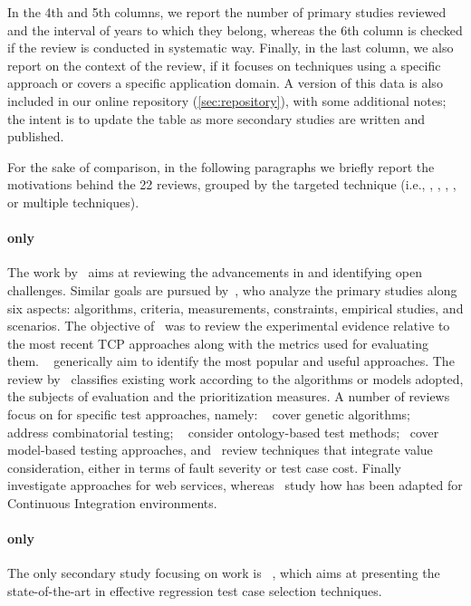 In the 4th and 5th columns, we report the number of primary studies reviewed and the interval of years to which they belong, whereas the 6th column is checked if the review is conducted in systematic way. 
Finally, in the last column, we also report on the context of the review, if it focuses on techniques using a specific approach or covers a specific application domain.
A version of this data is also included in our online repository (\autoref{sec:repository}), with some additional notes; the intent is to update the table as more secondary studies are written and published.

For the sake of comparison, in the following paragraphs we briefly report the motivations behind the 22 reviews, 
grouped by the targeted technique (i.e., \tcp, \tcs, \tsr, \tsa, or multiple techniques).

\paragraph{\tcp only}The work by~\citet{hao_test-case_2016} aims at reviewing the advancements in \tcp and  identifying open challenges. 
Similar goals are pursued by~\citet{lou_survey_2018}, who analyze the primary studies along six aspects: algorithms, criteria, measurements, constraints, empirical studies, and scenarios.
The objective of~\citet{khatibsyarbini_test_2018} was to review the experimental evidence relative to the most recent TCP approaches along with the metrics used for evaluating them. 
~\citet{mukherjee_survey_2018} generically aim to identify the most popular and useful \tcp approaches.
The review by~\citet{samad2021regression} classifies existing work according to the algorithms or models adopted, the subjects of evaluation and the prioritization measures.
A number of reviews focus on \tcp for specific test approaches, namely: ~\citet{bajaj_systematic_2019} 
cover genetic algorithms; ~\citet{abdul2021systematic} address combinatorial testing; ~\citet{hasnain2021ontology} consider ontology-based test methods;~\citet{mohd2021model} cover model-based testing approaches, and~\citet{ahmed_value_2022} review \tcp techniques that  integrate value consideration, either in terms of fault severity or test case cost.
Finally~\citet{hasnain_comprehensive_2020} investigate \tcp approaches for web services, 
whereas~\citet{prado_lima_test_2020} study how \tcp has been adapted for Continuous Integration environments.
 

\paragraph{\tcs only} The only secondary study focusing on \tcs work is ~\citet{kazmi_effective_2017}, which aims at presenting the state-of-the-art in effective regression test case selection techniques.

